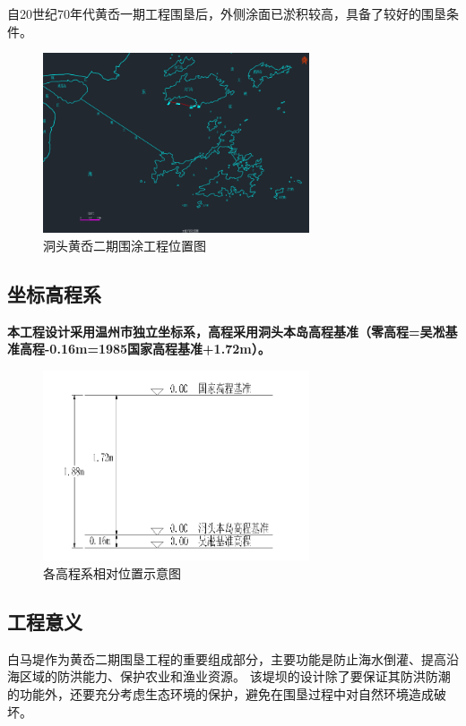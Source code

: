 \documentclass[UTF8, a4paper, 12pt]{ctexart} %
\begin{document}
自20世纪70年代黄岙一期工程围垦后，外侧涂面已淤积较高，具备了较好的围垦条件。
\begin{figure}[h]
    \centering
    \includegraphics[width=0.7\textwidth]{9.png}
    \caption{洞头黄岙二期围涂工程位置图}
    \label{fig:location}
    
\end{figure}

\subsection{坐标高程系}
\textbf{本工程设计采用温州市独立坐标系，高程采用洞头本岛高程基准（零高程=吴凇基准高程-0.16m=1985国家高程基准+1.72m）。}

\begin{figure}[h]
    \centering
    \includegraphics[width=0.7\textwidth]{1.png}
    \caption{各高程系相对位置示意图}
    \label{fig:location}
\end{figure}

\newpage
\subsection{工程意义}
白马堤作为黄岙二期围垦工程的重要组成部分，主要功能是防止海水倒灌、提高沿海区域的防洪能力、保护农业和渔业资源。
该堤坝的设计除了要保证其防洪防潮的功能外，还要充分考虑生态环境的保护，避免在围垦过程中对自然环境造成破坏。
\end{document}
